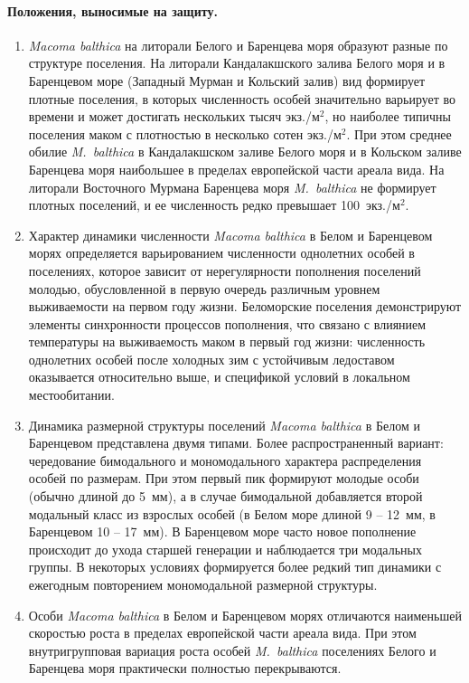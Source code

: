 \paragraph{Положения, выносимые на защиту.}
\begin{enumerate}
\item \textit{Macoma balthica} на литорали Белого и Баренцева моря образуют разные по структуре поселения.
На литорали Кандалакшского залива Белого моря и в Баренцевом море (Западный Мурман и Кольский залив) вид  формирует плотные поселения, в которых численность особей значительно варьирует во времени и может достигать нескольких тысяч экз./м$^2$, но наиболее типичны поселения маком с плотностью в несколько сотен экз./м$^2$. 
При этом среднее обилие \textit{M.~balthica} в Кандалакшском заливе Белого моря и в Кольском заливе Баренцева моря наибольшее в пределах европейской части ареала вида.
На литорали Восточного Мурмана Баренцева моря \textit{M.~balthica} не формирует плотных поселений, и ее численность редко превышает 100~экз./м$^2$.

\item Характер динамики численности \textit{Macoma balthica} в Белом и Баренцевом морях определяется варьированием численности однолетних особей в поселениях, которое зависит от нерегулярности пополнения поселений молодью, обусловленной в первую очередь различным уровнем выживаемости на первом году жизни.
Беломорские поселения демонстрируют элементы синхронности процессов пополнения, что связано с влиянием температуры на выживаемость маком в первый год жизни: численность однолетних особей после холодных зим с устойчивым ледоставом оказывается относительно выше, и спецификой условий в локальном местообитании.

\item Динамика размерной структуры поселений {\it Macoma balthica} в Белом и Баренцевом представлена двумя типами. 
Более распространенный вариант: чередование бимодального и мономодального характера распределения особей по размерам. 
При этом первый пик формируют молодые особи (обычно длиной до 5~мм), а в случае бимодальной добавляется второй модальный класс из взрослых особей (в Белом море длиной 9 -- 12~мм, в Баренцевом 10 -- 17~мм). 
В Баренцевом море часто новое пополнение происходит до ухода старшей генерации и наблюдается три модальных группы.
В некоторых условиях формируется более редкий тип динамики с ежегодным повторением мономодальной размерной структуры. 

\item Особи {\it Macoma balthica} в Белом и Баренцевом морях отличаются наименьшей скоростью роста в пределах европейской части ареала вида. При этом внутригрупповая вариация роста особей \textit{M.~balthica} поселениях Белого и Баренцева моря практически полностью перекрываются.

\end{enumerate}


